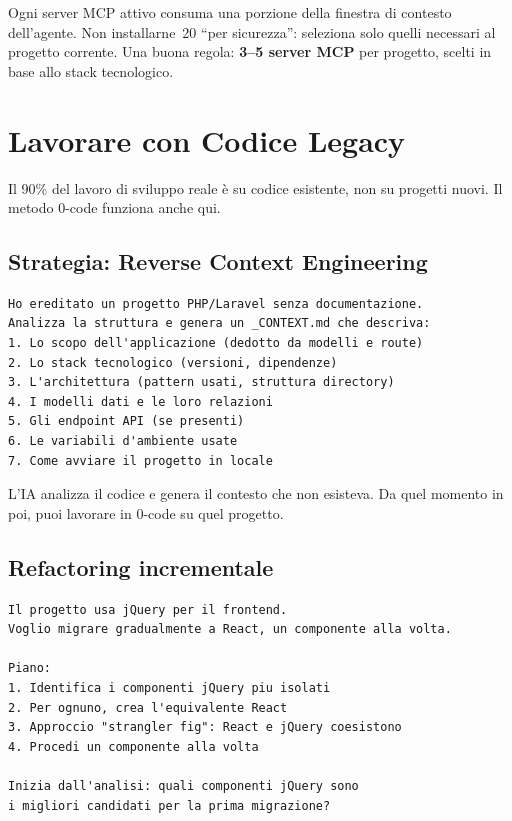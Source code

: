 \begin{warnbox}
Ogni server MCP attivo consuma una porzione della finestra di contesto dell'agente. Non installarne~20 ``per sicurezza'': seleziona solo quelli necessari al progetto corrente. Una buona regola: \textbf{3--5 server MCP} per progetto, scelti in base allo stack tecnologico.
\end{warnbox}

\section{Lavorare con Codice Legacy}

Il 90\% del lavoro di sviluppo reale è su codice esistente, non su progetti nuovi. Il metodo 0-code funziona anche qui.

\subsection{Strategia: Reverse Context Engineering}

\begin{lstlisting}[language={}]
Ho ereditato un progetto PHP/Laravel senza documentazione.
Analizza la struttura e genera un _CONTEXT.md che descriva:
1. Lo scopo dell'applicazione (dedotto da modelli e route)
2. Lo stack tecnologico (versioni, dipendenze)
3. L'architettura (pattern usati, struttura directory)
4. I modelli dati e le loro relazioni
5. Gli endpoint API (se presenti)
6. Le variabili d'ambiente usate
7. Come avviare il progetto in locale
\end{lstlisting}

L'IA analizza il codice e genera il contesto che non esisteva. Da quel momento in poi, puoi lavorare in 0-code su quel progetto.

\subsection{Refactoring incrementale}

\begin{lstlisting}[language={}]
Il progetto usa jQuery per il frontend.
Voglio migrare gradualmente a React, un componente alla volta.

Piano:
1. Identifica i componenti jQuery piu isolati
2. Per ognuno, crea l'equivalente React
3. Approccio "strangler fig": React e jQuery coesistono
4. Procedi un componente alla volta

Inizia dall'analisi: quali componenti jQuery sono
i migliori candidati per la prima migrazione?
\end{lstlisting}

